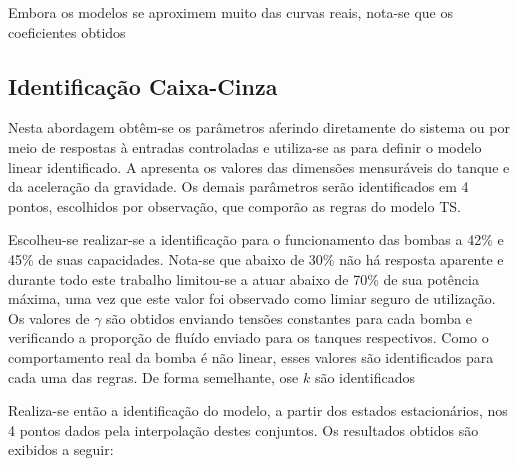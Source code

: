 Embora os modelos se aproximem muito das curvas reais, nota-se que os coeficientes obtidos %

\subsection{Identificação Caixa-Cinza}

Nesta abordagem obtêm-se os parâmetros aferindo diretamente do sistema ou por meio de respostas à entradas controladas e utiliza-se as  para definir o modelo linear identificado. A  apresenta os valores das dimensões mensuráveis do tanque e da aceleração da gravidade. Os demais parâmetros serão identificados em 4 pontos, escolhidos por observação, que comporão as regras do modelo TS. 

Escolheu-se realizar-se a identificação para o funcionamento das bombas a 42\% e 45\% de suas capacidades. Nota-se que abaixo de 30\% não há resposta aparente e durante todo este trabalho limitou-se a atuar abaixo de 70\% de sua potência máxima, uma vez que este valor foi observado como limiar seguro de utilização. Os valores de $\gamma$ são obtidos enviando tensões constantes para cada bomba e verificando a proporção de fluído enviado para os tanques respectivos. Como o comportamento real da bomba é não linear, esses valores são identificados para cada uma das regras. De forma semelhante, ose $k$ são identificados 

\begin{table}[!ht]
	\caption{Tensões Escolhidas}
	\label{tabIdentKs}
	\small
	\centering
\end{table}
Realiza-se então a identificação do modelo, a partir dos estados estacionários, nos 4 pontos dados pela interpolação destes conjuntos. Os resultados obtidos são exibidos a seguir:


